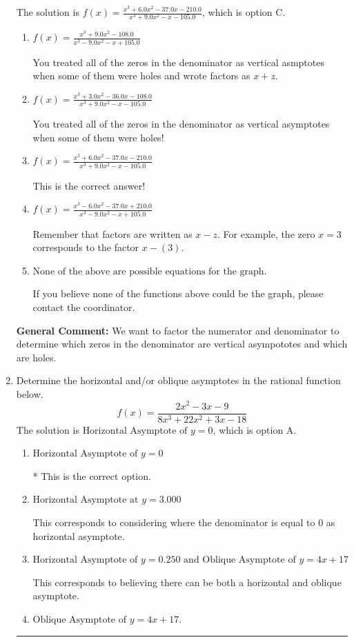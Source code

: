 \documentclass{extbook}[14pt]
\newcommand{\litem}[1]{\item #1

\rule{\textwidth}{0.4pt}}
\begin{document}
\begin{enumerate}
{The solution is \( f(x)=\frac{x^{3} +6.0 x^{2} -37.0 x -210.0}{x^{3} +9.0 x^{2} -x -105.0} \), which is option C.\begin{enumerate}[label=\Alph*.]
\item \( f(x)=\frac{x^{3} +9.0 x^{2} -108.0}{x^{3} -9.0 x^{2} -x + 105.0} \)

You treated all of the zeros in the denominator as vertical asmptotes when some of them were holes and wrote factors as $x+z$.
\item \( f(x)=\frac{x^{3} +3.0 x^{2} -36.0 x -108.0}{x^{3} +9.0 x^{2} -x -105.0} \)

You treated all of the zeros in the denominator as vertical asymptotes when some of them were holes!
\item \( f(x)=\frac{x^{3} +6.0 x^{2} -37.0 x -210.0}{x^{3} +9.0 x^{2} -x -105.0} \)

This is the correct answer!
\item \( f(x)=\frac{x^{3} -6.0 x^{2} -37.0 x + 210.0}{x^{3} -9.0 x^{2} -x + 105.0} \)

Remember that factors are written as $x-z$. For example, the zero $x=3$ corresponds to the factor $x-(3)$.
\item \( \text{None of the above are possible equations for the graph.} \)

If you believe none of the functions above could be the graph, please contact the coordinator.
\end{enumerate}

\textbf{General Comment:} We want to factor the numerator and denominator to determine which zeros in the denominator are vertical asympototes and which are holes.
}
\litem{
Determine the horizontal and/or oblique asymptotes in the rational function below.
\[ f(x) = \frac{2x^{2} -3 x -9}{8x^{3} +22 x^{2} +3 x -18} \]The solution is \( \text{Horizontal Asymptote of } y = 0 \), which is option A.\begin{enumerate}[label=\Alph*.]
\item \( \text{Horizontal Asymptote of } y = 0 \)

* This is the correct option.
\item \( \text{Horizontal Asymptote at } y = 3.000 \)

This corresponds to considering where the denominator is equal to 0 as horizontal asymptote.
\item \( \text{Horizontal Asymptote of } y = 0.250 \text{ and Oblique Asymptote of } y = 4x + 17 \)

This corresponds to believing there can be both a horizontal and oblique asymptote.
\item \( \text{Oblique Asymptote of } y = 4x + 17. \)


\end{enumerate}}
\end{enumerate}
\end{document}
